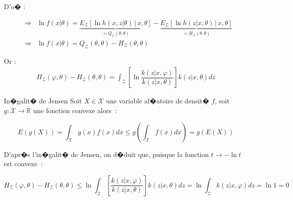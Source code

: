 D'o� :%

        \begin{eqnarray*}
        &  \Longrightarrow & \ln f\left(  x\left|  \theta\right.  \right)  =
                \underset {=Q_{\mathcal{Z}}\left(  \theta,\theta\right)
            }{\underbrace{E_{\mathcal{Z} }\left[  \ln h\left(  x,z\left|  \theta\right.  \right)  \,\left|
                 \,x,\theta\right.  \right]
            }}-\underset{=H_{\mathcal{Z}}\left(  \theta ,\theta\right)  }{\underbrace{E_{\mathcal{Z}}
                    \left[  \ln h\left(  z\left|
            x,\theta\right.  \right)  \,\left|  \,x,\theta\right.  \right]  }}\\
        &  \Longrightarrow & \ln f\left(  x\left|  \theta\right.  \right) =Q_{\mathcal{Z}}\left(  
                \theta,\theta\right) -H_{\mathcal{Z}}\left(
            \theta,\theta\right)
        \end{eqnarray*}

Or :
        \begin{eqnarray*}
        H_{\mathcal{Z}}\left(  \varphi,\theta\right)  -H_{\mathcal{Z}}\left( \theta,\theta\right)
              =\int_{\mathcal{Z}}\left[  \ln\dfrac{k\left(
        z\left|  x,\varphi\right.  \right)  }{k\left(  z\left|  x,\theta\right. \right)  }\right]
              k\left(  z\left|  x,\theta\right.  \right)  dz
        \end{eqnarray*}




            \begin{xtheorem}{In�galit� de Jensen}
            \label{theoreme_inegalite_jensen_1}%
            Soit $X\in\mathcal{X}$ une variable al�atoire de densit� $f$, soit $g:\mathcal{X}\longrightarrow\mathbb{R}$ 
            une fonction convexe alors~:
            
                    $$
                    E\left(  g\left(  X\right)  \right)  =\int _{\mathcal{X}}g\left(  x\right)  
                                f\left(  x\right)  dx\leqslant g\left(
                    \int_{\mathcal{X}}f\left(  x\right)  dx\right)  =g\left(  E\left( X\right)  \right)
                    $$
                    
            \end{xtheorem}

D'apr�s l'in�galit� de Jensen, on d�duit que, puisque la fonction $t\rightarrow-\ln t$ est convexe~:

        $$
        H_{\mathcal{Z}}\left(  \varphi,\theta\right)  -H_{\mathcal{Z}}
                    \left( \theta,\theta\right)  \leqslant\ln\int_{\mathcal{Z}}\left[
        \dfrac{k\left(  z\left|  x,\varphi\right.  \right)  }{k\left(  z\left| x,\theta\right.  \right)  }\right] 
         k\left(  z\left|  x,\theta\right.
        \right)  dz=\ln\int_{\mathcal{Z}}k\left(  z\left|  x,\varphi\right. \right)  dz=\ln1=0
        $$

